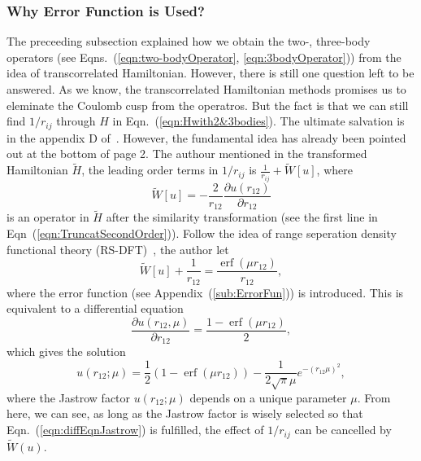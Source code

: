 \subsubsection{Why Error Function is Used?}
The preceeding subsection explained how we obtain the two-, three-body operators (see Eqns.~(\ref{eqn:two-bodyOperator}, \ref{eqn:3bodyOperator})) from the idea of transcorrelated Hamiltonian. However, there is still one question left to be answered. As we know, the transcorrelated Hamiltonian methods promises us to eleminate the Coulomb cusp from the operatros. But the fact is that we can still find $1/r_{ij}$ through $\hat{H}$ in Eqn.~(\ref{eqn:Hwith2&3bodies}). The ultimate salvation is in the appendix D of~\cite{giner2021transcorrelated}. However, the fundamental idea has already been pointed out at the bottom of page 2. The authour mentioned in the transformed Hamiltonian $\tilde{H}$, the leading order terms in  $1/r_{ij}$ is $\frac{1}{r_{ij}}+\tilde{W}[u]$, where
\begin{equation}
    \tilde{W}[u]=-\frac{2}{r_{12}}\frac{\partial u(r_{12})}{\partial r_{12}}
\end{equation}
is an operator in $\tilde{H}$ after the similarity transformation (see the first line in Eqn~(\ref{eqn:TruncatSecondOrder})). Follow the idea of range seperation density functional theory (RS-DFT)~\cite{RS-DFT_Pernal}, the author let
\begin{equation}
    \tilde{W}[u]+\frac{1}{r_{12}}=\frac{\operatorname{erf}(\mu r_{12})}{r_{12}},
\end{equation}
where the error function (see Appendix~(\ref{sub:ErrorFun})) is introduced. This is equivalent to a differential equation
\begin{equation}
    \frac{\partial u(r_{12},\mu)}{\partial r_{12}}=\frac{1-\operatorname{erf}(\mu r_{12})}{2},
    \label{eqn:diffEqnJastrow}
\end{equation}
which gives the solution 
\begin{equation}
    u(r_{12};\mu)=\frac{1}{2}\left(1-\operatorname{erf}(\mu r_{12})\right)-\frac{1}{2\sqrt{\pi}\mu}e^{-(r_{12}\mu)^2},
\end{equation}
where the Jastrow factor $u(r_{12};\mu)$ depends on a unique parameter $\mu$. From here, we can see, as long as the Jastrow factor is wisely selected so that Eqn.~(\ref{eqn:diffEqnJastrow}) is fulfilled, the effect of $1/r_{ij}$ can be cancelled by $\tilde{W}(u)$.


